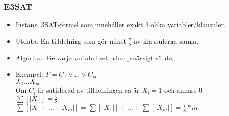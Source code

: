 \subsubsection{E3SAT}
\begin{itemize}
\item{Instans: 3SAT-formel som innehåller exakt 3 olika variabler/klausuler.}
\item{Utdata: En tilldelning som gör minst $\frac{7}{8}$ av klausulerna
    sanna.}
\item{Algoritm: Ge varje variabel sett slumpmässigt värde.}
\item{Exempel:
    \(F = C_1 \vee \ldots \vee C_m\) \\
    \(X_1 \ldots X_m \) \\
    Om $C_i$ är satisferad av tilldelningen så är $X_i = 1$ och annars $0$ \\
    \(\sum{[|X_i|]} = \frac{7}{8}\) \\
    \(\sum{[|X_1 + \ldots + X_m|]} = \sum{[|X_1|]} + \ldots + \sum{[|X_m|]} =
    \frac{7}{8} * m\)
  }
\end{itemize}